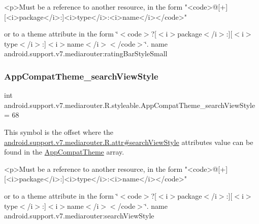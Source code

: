 \begin{DoxyVerb}      <p>Must be a reference to another resource, in the form "<code>@[+][<i>package</i>:]<i>type</i>:<i>name</i></code>"
\end{DoxyVerb}
 or to a theme attribute in the form \char`\"{}$<$code$>$?\mbox{[}$<$i$>$package$<$/i$>$\+:\mbox{]}\mbox{[}$<$i$>$type$<$/i$>$\+:\mbox{]}$<$i$>$name$<$/i$>$$<$/code$>$\char`\"{}.  name android.\+support.\+v7.\+mediarouter\+:rating\+Bar\+Style\+Small \mbox{\label{classandroid_1_1support_1_1v7_1_1mediarouter_1_1R_1_1styleable_ae78fcc03ef34fe74c5a9824c9cb8df51}} 
\subsubsection{\texorpdfstring{App\+Compat\+Theme\+\_\+search\+View\+Style}{AppCompatTheme\_searchViewStyle}}
{\footnotesize\ttfamily int android.\+support.\+v7.\+mediarouter.\+R.\+styleable.\+App\+Compat\+Theme\+\_\+search\+View\+Style = 68\hspace{0.3cm}{\ttfamily [static]}}

This symbol is the offset where the \hyperlink{classandroid_1_1support_1_1v7_1_1mediarouter_1_1R_1_1attr_a7f04c9e947e8e75cd0c7e00a8dd23370}{android.\+support.\+v7.\+mediarouter.\+R.\+attr\#search\+View\+Style} attribute\textquotesingle{}s value can be found in the \hyperlink{classandroid_1_1support_1_1v7_1_1mediarouter_1_1R_1_1styleable_a4e3d3900c75d49aeb2f283cac00214d6}{App\+Compat\+Theme} array.

\begin{DoxyVerb}      <p>Must be a reference to another resource, in the form "<code>@[+][<i>package</i>:]<i>type</i>:<i>name</i></code>"
\end{DoxyVerb}
 or to a theme attribute in the form \char`\"{}$<$code$>$?\mbox{[}$<$i$>$package$<$/i$>$\+:\mbox{]}\mbox{[}$<$i$>$type$<$/i$>$\+:\mbox{]}$<$i$>$name$<$/i$>$$<$/code$>$\char`\"{}.  name android.\+support.\+v7.\+mediarouter\+:search\+View\+Style \mbox{\label{classandroid_1_1support_1_1v7_1_1mediarouter_1_1R_1_1styleable_a94480fbd3dc2f8051c48e89dbc33eab6}} 
